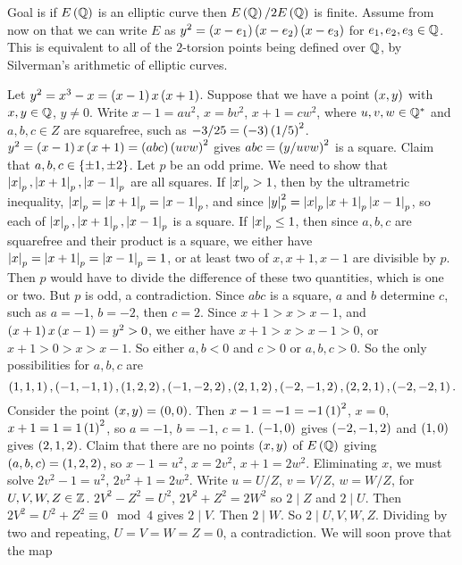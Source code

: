 
Goal is if $ E\left( \mathbb{Q} \right) $ is an elliptic curve then $ E\left( \mathbb{Q} \right) / 2E\left( \mathbb{Q} \right) $ is finite. Assume from now on that we can write $ E $ as $ y^2 = \left( x - e_1 \right)\left( x - e_2 \right)\left( x - e_3 \right) $ for $ e_1, e_2, e_3 \in \mathbb{Q} $. This is equivalent to all of the $ 2 $-torsion points being defined over $ \mathbb{Q} $, by Silverman's arithmetic of elliptic curves.

\begin{example*}
Let $ y^2 = x^3 - x = \left( x - 1 \right)x\left( x + 1 \right) $. Suppose that we have a point $ \left( x, y \right) $ with $ x, y \in \mathbb{Q} $, $ y \ne 0 $. Write $ x - 1 = au^2 $, $ x = bv^2 $, $ x + 1 = cw^2 $, where $ u, v, w \in \mathbb{Q}^* $ and $ a, b, c \in Z $ are squarefree, such as $ -3 / 25 = \left( -3 \right)\left( 1 / 5 \right)^2 $. $ y^2 = \left( x - 1 \right)x\left( x + 1 \right) = \left( abc \right)\left( uvw \right)^2 $ gives $ abc = \left( y / uvw \right)^2 $ is a square. Claim that $ a, b, c \in \left\{ \pm 1, \pm 2 \right\} $. Let $ p $ be an odd prime. We need to show that $ \left\lvert x \right\rvert_p, \left\lvert x + 1 \right\rvert_p, \left\lvert x - 1 \right\rvert_p $ are all squares. If $ \left\lvert x \right\rvert_p > 1 $, then by the ultrametric inequality, $ \left\lvert x \right\rvert_p = \left\lvert x + 1 \right\rvert_p = \left\lvert x - 1 \right\rvert_p $, and since $ \left\lvert y \right\rvert_p^2 = \left\lvert x \right\rvert_p\left\lvert x + 1 \right\rvert_p\left\lvert x - 1 \right\rvert_p $, so each of $ \left\lvert x \right\rvert_p, \left\lvert x + 1 \right\rvert_p, \left\lvert x - 1 \right\rvert_p $ is a square. If $ \left\lvert x \right\rvert_p \le 1 $, then since $ a, b, c $ are squarefree and their product is a square, we either have $ \left\lvert x \right\rvert_p = \left\lvert x + 1 \right\rvert_p = \left\lvert x - 1 \right\rvert_p = 1 $, or at least two of $ x, x + 1, x - 1 $ are divisible by $ p $. Then $ p $ would have to divide the difference of these two quantities, which is one or two. But $ p $ is odd, a contradiction. Since $ abc $ is a square, $ a $ and $ b $ determine $ c $, such as $ a = -1 $, $ b = -2 $, then $ c = 2 $. Since $ x + 1 > x > x - 1 $, and $ \left( x + 1 \right)x\left( x - 1 \right) = y^2 > 0 $, we either have $ x + 1 > x > x - 1 > 0 $, or $ x + 1 > 0 > x > x - 1 $. So either $ a, b < 0 $ and $ c > 0 $ or $ a, b, c > 0 $. So the only possibilities for $ a, b, c $ are
$$ \left( 1, 1, 1 \right), \left( -1, -1, 1 \right), \left( 1, 2, 2 \right), \left( -1, -2, 2 \right), \left( 2, 1, 2 \right), \left( -2, -1, 2 \right), \left( 2, 2, 1 \right), \left( -2, -2, 1 \right). $$
Consider the point $ \left( x, y \right) = \left( 0, 0 \right) $. Then $ x - 1 = -1 = -1\left( 1 \right)^2 $, $ x = 0 $, $ x + 1 = 1 = 1\left( 1 \right)^2 $, so $ a = -1 $, $ b = -1 $, $ c = 1 $. $ \left( -1, 0 \right) $ gives $ \left( -2, -1, 2 \right) $ and $ \left( 1, 0 \right) $ gives $ \left( 2, 1, 2 \right) $. Claim that there are no points $ \left( x, y \right) $ of $ E\left( \mathbb{Q} \right) $ giving $ \left( a, b, c \right) = \left( 1, 2, 2 \right) $, so $ x - 1 = u^2 $, $ x = 2v^2 $, $ x + 1 = 2w^2 $. Eliminating $ x $, we must solve $ 2v^2 - 1 = u^2 $, $ 2v^2 + 1 = 2w^2 $. Write $ u = U / Z $, $ v = V / Z $, $ w = W / Z $, for $ U, V, W, Z \in \mathbb{Z} $. $ 2V^2 - Z^2 = U^2 $, $ 2V^2 + Z^2 = 2W^2 $ so $ 2 \mid Z $ and $ 2 \mid U $. Then $ 2V^2 = U^2 + Z^2 \equiv 0 \mod 4 $ gives $ 2 \mid V $. Then $ 2 \mid W $. So $ 2 \mid U, V, W, Z $. Dividing by two and repeating, $ U = V = W = Z = 0 $, a contradiction. We will soon prove that the map

\end{example*}
